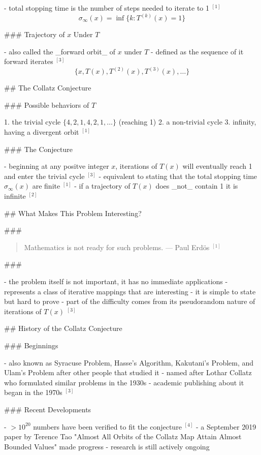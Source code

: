 \documentclass[12pt, a4paper, reqno]{amsart}
\begin{document}
- total stopping time is the number of steps needed to iterate to 1 $^{[1]}$
$$\sigma_{\infty}(x)=\inf\{k:T^{(k)}(x)=1\}$$ 

### Trajectory of $x$ Under $T$

- also called the _forward orbit_ of $x$ under $T$
- defined as the sequence of it forward iterates $^{[3]}$
$$\{x, T(x), T^{(2)}(x), T^{(3)}(x),\dots\}$$ 

## The Collatz Conjecture

### Possible behaviors of $T$

1. the trivial cycle $\{4,2,1,4,2,1,\dots\}$ (reaching 1)
2. a non-trivial cycle
3. infinity, having a divergent orbit $^{[1]}$

### The Conjecture

- beginning at any positve integer $x$, iterations of $T(x)$ will eventually
reach 1 and enter the trivial cycle $^{[3]}$
- equivalent to stating that the total stopping time 
$\sigma_{\infty}(x)$ are finite $^{[1]}$
- if a trajectory of $T(x)$ does _not_ contain 1 it is infinite $^{[2]}$

## What Makes This Problem Interesting?

###

\begin{quote}Mathematics is not ready for such problems. \newline
\flushright --- Paul Erdös $^{[1]}$\end{quote}

### 

- the problem itself is not important, it has no immediate applications
- represents a class of iterative mappings that are interesting
- it is simple to state but hard to prove
- part of the difficulty comes from its pseudorandom nature of iterations of 
$T(x)$ $^{[3]}$

## History of the Collatz Conjecture

### Beginnings

- also known as Syracuse Problem, Hasse's Algorithm, Kakutani's Problem, and
Ulam's Problem after other people that studied it
- named after Lothar Collatz who formulated similar problems in the 1930s
- academic publishing about it began in the 1970s $^{[3]}$

### Recent Developments

- $>10^{20}$ numbers have been verified to fit the conjecture $^{[4]}$
- a September 2019 paper by Terence Tao "Almost All Orbits of the Collatz Map Attain
Almost Bounded Values" made progress
- research is still actively ongoing
\end{document}
